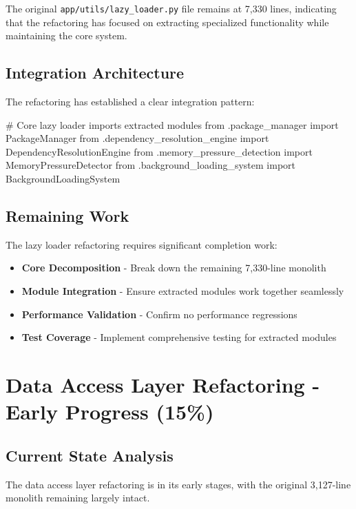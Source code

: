 \documentclass[11pt]{article}
\begin{document}
The original \texttt{app/utils/lazy\_loader.py} file remains at 7,330 lines, indicating that the refactoring has focused on extracting specialized functionality while maintaining the core system.

\subsection{Integration Architecture}

The refactoring has established a clear integration pattern:

\begin{typescriptcode}
# Core lazy loader imports extracted modules
from .package_manager import PackageManager
from .dependency_resolution_engine import DependencyResolutionEngine
from .memory_pressure_detection import MemoryPressureDetector
from .background_loading_system import BackgroundLoadingSystem
\end{typescriptcode}

\subsection{Remaining Work}

The lazy loader refactoring requires significant completion work:

\begin{itemize}
\item \textbf{Core Decomposition} - Break down the remaining 7,330-line monolith
\item \textbf{Module Integration} - Ensure extracted modules work together seamlessly
\item \textbf{Performance Validation} - Confirm no performance regressions
\item \textbf{Test Coverage} - Implement comprehensive testing for extracted modules
\end{itemize}

\section{Data Access Layer Refactoring - Early Progress (15\%)}

\subsection{Current State Analysis}

The data access layer refactoring is in its early stages, with the original 3,127-line monolith remaining largely intact.
\end{document}
